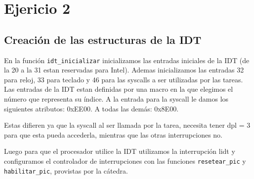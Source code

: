 \section{Ejericio 2}

\subsection{Creación de las estructuras de la IDT} 

En la función \texttt{idt\_inicializar} inicializamos las entradas iniciales de la IDT (de la 20 a la 31 estan reservadas para Intel).
Ademas inicializamos las entradas 32 para reloj, 33 para teclado y 46 para las syscalls a ser utilizadas por las tareas.
Las entradas de la IDT estan definidas por una macro en la que elegimos el número que representa su índice. 
A la entrada para la syscall le damos los siguientes atributos: 0xEE00.
A todas las demás: 0x8E00.


Estas difieren ya que la syscall al ser llamada por la tarea, necesita tener dpl = 3 para que esta pueda accederla, mientras que las otras interrupciones no.

Luego para que el procesador utilice la IDT utilizamos la interrupción lidt y configuramos el controlador de interrupciones con las funciones \texttt{resetear\_pic} y \texttt{habilitar\_pic}, provistas por la cátedra.